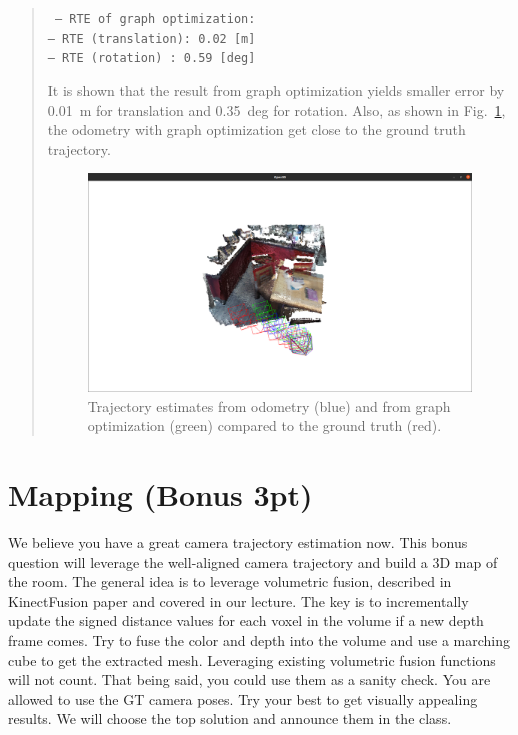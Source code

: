 \documentclass[11pt]{article}
\begin{document}
\begin{quote}
{\tt
-- RTE of graph optimization:       \\
-- RTE (translation): 0.02 [m]      \\
-- RTE (rotation)   : 0.59 [deg]
}

It is shown that the result from graph optimization yields smaller error by 0.01~\textrm{m} for translation and 0.35~\textrm{deg} for rotation. Also, as shown in Fig.~\ref{fig:gt_odom_opt}, the odometry with graph optimization get close to the ground truth trajectory.

\begin{figure}[h]
    \centering
    \includegraphics[width=1.0\linewidth]{gt_odom_opt.png}
    \caption{Trajectory estimates from odometry (blue) and from graph optimization (green) compared to the ground truth (red).}
    \label{fig:gt_odom_opt}
\end{figure}

\end{quote}


\section*{Mapping (Bonus 3pt)}

We believe you have a great camera trajectory estimation now. This bonus question will leverage the well-aligned camera trajectory and build a 3D map of the room. The general idea is to leverage volumetric fusion, described in KinectFusion paper and covered in our lecture. The key is to incrementally update the signed distance values for each voxel in the volume if a new depth frame comes. Try to fuse the color and depth into the volume and use a marching cube to get the extracted mesh. Leveraging existing volumetric fusion functions will not count. That being said, you could use them as a sanity check. You are allowed to use the GT camera poses. Try your best to get visually appealing results. We will choose the top solution and announce them in the class. 
\end{document}
